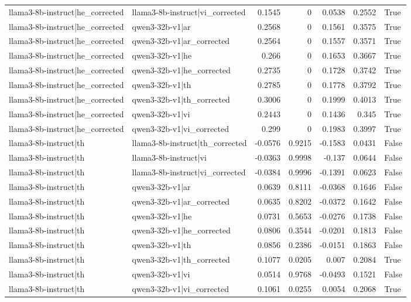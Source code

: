 \begin{table}
\begin{tabular}{l l r r r r l}
llama3-8b-instruct|he_corrected & llama3-8b-instruct|vi_corrected & 0.1545 & 0 & 0.0538 & 0.2552 & True \\
llama3-8b-instruct|he_corrected & qwen3-32b-v1|ar & 0.2568 & 0 & 0.1561 & 0.3575 & True \\
llama3-8b-instruct|he_corrected & qwen3-32b-v1|ar_corrected & 0.2564 & 0 & 0.1557 & 0.3571 & True \\
llama3-8b-instruct|he_corrected & qwen3-32b-v1|he & 0.266 & 0 & 0.1653 & 0.3667 & True \\
llama3-8b-instruct|he_corrected & qwen3-32b-v1|he_corrected & 0.2735 & 0 & 0.1728 & 0.3742 & True \\
llama3-8b-instruct|he_corrected & qwen3-32b-v1|th & 0.2785 & 0 & 0.1778 & 0.3792 & True \\
llama3-8b-instruct|he_corrected & qwen3-32b-v1|th_corrected & 0.3006 & 0 & 0.1999 & 0.4013 & True \\
llama3-8b-instruct|he_corrected & qwen3-32b-v1|vi & 0.2443 & 0 & 0.1436 & 0.345 & True \\
llama3-8b-instruct|he_corrected & qwen3-32b-v1|vi_corrected & 0.299 & 0 & 0.1983 & 0.3997 & True \\
llama3-8b-instruct|th & llama3-8b-instruct|th_corrected & -0.0576 & 0.9215 & -0.1583 & 0.0431 & False \\
llama3-8b-instruct|th & llama3-8b-instruct|vi & -0.0363 & 0.9998 & -0.137 & 0.0644 & False \\
llama3-8b-instruct|th & llama3-8b-instruct|vi_corrected & -0.0384 & 0.9996 & -0.1391 & 0.0623 & False \\
llama3-8b-instruct|th & qwen3-32b-v1|ar & 0.0639 & 0.8111 & -0.0368 & 0.1646 & False \\
llama3-8b-instruct|th & qwen3-32b-v1|ar_corrected & 0.0635 & 0.8202 & -0.0372 & 0.1642 & False \\
llama3-8b-instruct|th & qwen3-32b-v1|he & 0.0731 & 0.5653 & -0.0276 & 0.1738 & False \\
llama3-8b-instruct|th & qwen3-32b-v1|he_corrected & 0.0806 & 0.3544 & -0.0201 & 0.1813 & False \\
llama3-8b-instruct|th & qwen3-32b-v1|th & 0.0856 & 0.2386 & -0.0151 & 0.1863 & False \\
llama3-8b-instruct|th & qwen3-32b-v1|th_corrected & 0.1077 & 0.0205 & 0.007 & 0.2084 & True \\
llama3-8b-instruct|th & qwen3-32b-v1|vi & 0.0514 & 0.9768 & -0.0493 & 0.1521 & False \\
llama3-8b-instruct|th & qwen3-32b-v1|vi_corrected & 0.1061 & 0.0255 & 0.0054 & 0.2068 & True \\

\end{tabular}
\end{table}
